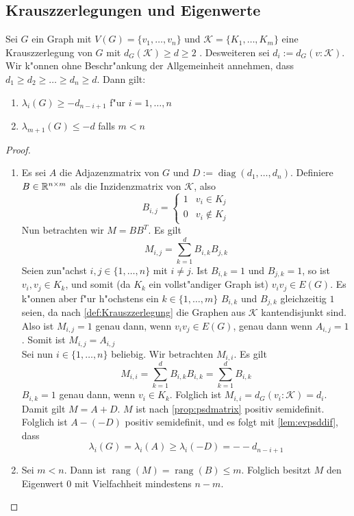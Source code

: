 \subsection{Krauszzerlegungen und Eigenwerte}

\begin{theorem}
  \label{thm:KrauszEigenwerte}
  Sei $G$ ein Graph mit $V(G)=\{v_1,\dots,v_n\}$ und $\mathcal K=\{K_1,\dots,K_m\}$ eine Krauszzerlegung von $G$ mit $d_G(\mathcal K) \geq d \geq 2$ . Desweiteren sei $d_i := d_G(v:\mathcal K)$. 
  Wir k"onnen ohne Beschr"ankung der Allgemeinheit annehmen, dass $d_1\geq d_2 \geq \dots \geq d_n \geq d$.
  Dann gilt: 
  \begin{enumerate}[label=(\alph*)]
    \item $\lambda_i(G) \geq -d_{n-i+1}$ f"ur $i = 1, \dots , n$
    \item $\lambda_{m+1}(G) \leq -d$ falls $m < n$
  \end{enumerate}
\end{theorem}
\begin{proof}
  \begin{enumerate}[label=(\alph*)]
    \item Es sei $A$ die Adjazenzmatrix von $G$ und $D := \operatorname{diag}(d_1,\dots,d_n)$. Definiere $B\in{\mathbb{R}}^{n\times m}$ als die Inzidenzmatrix von $\mathcal K$, also $$B_{i,j} = \begin{cases}
        1 & v_i \in K_j \\ 0 & v_i \notin K_j
      \end{cases}$$ 
      Nun betrachten wir $M=BB^{T}$. Es gilt
      \[
        M_{i,j} = \sum\limits_{k=1}^{d}B_{i,k}B_{j,k}
      \]
      Seien zun"achst $i,j \in \{1,\dots,n\}$ mit $i\neq j$. Ist $B_{i,k} = 1$ und $B_{j,k} = 1$, so ist $v_i,v_j  \in K_k$, und somit (da $K_k$ ein vollst"andiger Graph ist) $v_iv_j\in E(G)$. Es k"onnen aber f"ur h"ochstens ein $k\in \{1,\dots,m\}$ $B_{i,k}$ und $B_{j,k}$ gleichzeitig $1$ seien, da nach \ref{def:Krauszzerlegung} die Graphen aus $\mathcal K$ kantendisjunkt sind. Also ist $M_{i,j}= 1 $ genau dann, wenn $v_iv_j\in E(G)$, genau dann wenn $A_{i,j} = 1$. Somit ist $M_{i,j}=A_{i,j}$\\
      Sei nun $i\in\{1,\dots,n\}$ beliebig. Wir betrachten $M_{i,i}$. Es gilt 
      \[
        M_{i,i} = \sum\limits_{k=1}^{d}B_{i,k}B_{i,k} = \sum\limits_{k=1}^{d} B_{i,k}
      \]
      $B_{i,k}=1$ genau dann, wenn $v_i \in K_k$. Folglich ist $M_{i,i}= d_G(v_i:\mathcal K)= d_i$. Damit gilt $M=A+D$. $M$ ist nach \ref{prop:psdmatrix} positiv semidefinit.
      Folglich ist $A- (-D)$ positiv semidefinit, und es folgt mit \ref{lem:evpsddif}, dass 
      \begin{equation*}
        \lambda_i(G) = \lambda_i(A) \geq \lambda_i(-D) =- -d_{n-i+1}
      \end{equation*}
    \item Sei $m<n$. Dann ist $\operatorname{rang}(M)= \operatorname{rang}(B) \leq m$. Folglich besitzt $M$ den Eigenwert $0$ mit Vielfachheit mindestens $n-m$.
  \end{enumerate}
\end{proof}
